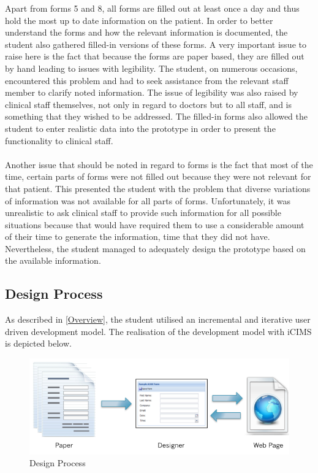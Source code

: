 \noindent Apart from forms 5 and 8, all forms are filled out at least once a day and thus hold the most up to date information on the patient. In order to better understand the forms and how the relevant information is documented, the student also gathered filled-in versions of these forms. A very important issue to raise here is the fact that because the forms are paper based, they are filled out by hand leading to issues with legibility. The student, on numerous occasions, encountered this problem and had to seek assistance from the relevant staff member to clarify noted information. The issue of legibility was also raised by clinical staff themselves, not only in regard to doctors but to all staff, and is something that they wished to be addressed. The filled-in forms also allowed the student to enter realistic data into the prototype in order to present the functionality to clinical staff.
\\ \\
Another issue that should be noted in regard to forms is the fact that most of the time, certain parts of forms were not filled out because they were not relevant for that patient. This presented the student with the problem that diverse variations of information was not available for all parts of forms. Unfortunately, it was unrealistic to ask clinical staff to provide such information for all possible situations because that would have required them to use a considerable amount of their time to generate the information, time that they did not have. Nevertheless, the student managed to adequately design the prototype based on the available information.

\subsection{Design Process}
As described in \ref{Overview}, the student utilised an incremental and iterative user driven development model. The realisation of the development model with iCIMS is depicted below.

\begin{figure}[hp]
				\centering
				\includegraphics[scale=1.0, width=120mm]{Images/Design-Process}
				\caption{Design Process}
\end{figure} 


